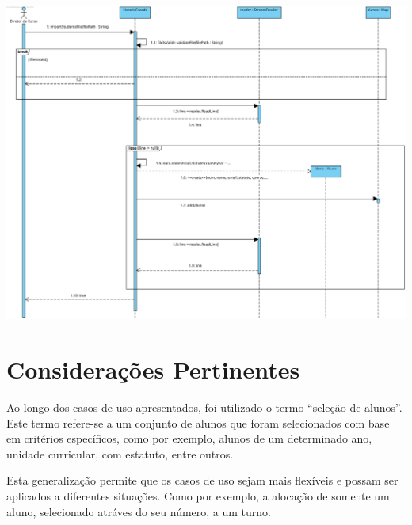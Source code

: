 \documentclass[a4paper,12pt]{scrreprt}
\begin{document}
\begin{minipage}{\textwidth}
    \centering
    \includegraphics[width=1\textwidth]{images/sequence-diagrams/3-importar-alunos.png}
    \label{fig:7-3-diagrama_de_sequencia_importar_alunos}
\end{minipage}



\chapter{Considerações Pertinentes}
\vspace{1cm}

Ao longo dos casos de uso apresentados, foi utilizado o termo “seleção de alunos”.
Este termo refere-se a um conjunto de alunos que foram selecionados com base em critérios específicos,
como por exemplo, alunos de um determinado ano, unidade curricular, com estatuto, entre outros.

Esta generalização permite que os casos de uso sejam mais flexíveis
e possam ser aplicados a diferentes situações. Como por exemplo, a alocação de somente
um aluno, selecionado atráves do seu número, a um turno.
\end{document}
